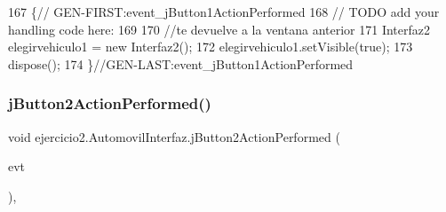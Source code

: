 \begin{DoxyCode}
167                                                                          \{\textcolor{comment}{//
      GEN-FIRST:event\_jButton1ActionPerformed}
168         \textcolor{comment}{// TODO add your handling code here:}
169         
170         \textcolor{comment}{//te devuelve a la ventana anterior}
171         Interfaz2 elegirvehiculo1 = \textcolor{keyword}{new} Interfaz2();
172         elegirvehiculo1.setVisible(\textcolor{keyword}{true});
173         dispose();
174     \}\textcolor{comment}{//GEN-LAST:event\_jButton1ActionPerformed}
\end{DoxyCode}
\mbox{\label{classejercicio2_1_1_automovil_interfaz_a3629812b4c3141b32100171144e84be5}} 
\subsubsection{\texorpdfstring{j\+Button2\+Action\+Performed()}{jButton2ActionPerformed()}}
{\footnotesize\ttfamily void ejercicio2.\+Automovil\+Interfaz.\+j\+Button2\+Action\+Performed (\begin{DoxyParamCaption}\item[{java.\+awt.\+event.\+Action\+Event}]{evt }\end{DoxyParamCaption})\hspace{0.3cm}{\ttfamily [inline]}, {\ttfamily [private]}}


